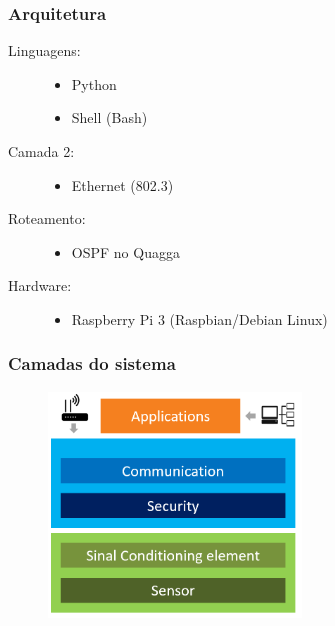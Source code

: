 
\begin{frame}
\frametitle{Arquitetura}
\begin{description}
	\item [Linguagens:] \begin{itemize}
		\item Python
		\item Shell (Bash)
	\end{itemize}
	\item [Camada 2:]
	\begin{itemize}
		\item Ethernet (802.3)
	\end{itemize}
	\item [Roteamento:]
	\begin{itemize}
		\item OSPF no Quagga
	\end{itemize}
	\item [Hardware:]
	\begin{itemize}
		\item Raspberry Pi 3 (Raspbian/Debian Linux)
	\end{itemize}
\end{description}

\end{frame}


\begin{frame}
	\frametitle{Camadas do sistema}

	\begin{figure}[h]
		\centering
		\includegraphics[width=0.6\textwidth]{"../Relatorio/Artigo IoT-G4/figs/system-layer"}
		\label{System-Layers}
 	\end{figure}

\end{frame}

